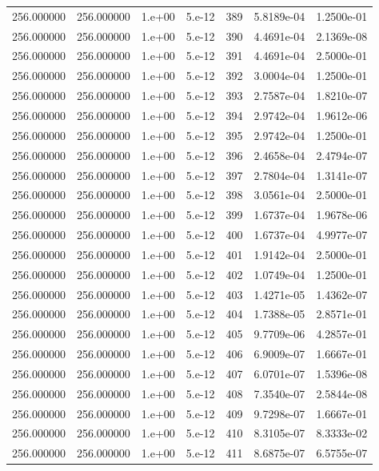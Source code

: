 \begin{table}[htbp]
\begin{tabular}{rrrrrrr}
256.000000 & 256.000000 & 1.e+00 & 5.e-12 & 389 & 5.8189e-04 & 1.2500e-01 \\
256.000000 & 256.000000 & 1.e+00 & 5.e-12 & 390 & 4.4691e-04 & 2.1369e-08 \\
256.000000 & 256.000000 & 1.e+00 & 5.e-12 & 391 & 4.4691e-04 & 2.5000e-01 \\
256.000000 & 256.000000 & 1.e+00 & 5.e-12 & 392 & 3.0004e-04 & 1.2500e-01 \\
256.000000 & 256.000000 & 1.e+00 & 5.e-12 & 393 & 2.7587e-04 & 1.8210e-07 \\
256.000000 & 256.000000 & 1.e+00 & 5.e-12 & 394 & 2.9742e-04 & 1.9612e-06 \\
256.000000 & 256.000000 & 1.e+00 & 5.e-12 & 395 & 2.9742e-04 & 1.2500e-01 \\
256.000000 & 256.000000 & 1.e+00 & 5.e-12 & 396 & 2.4658e-04 & 2.4794e-07 \\
256.000000 & 256.000000 & 1.e+00 & 5.e-12 & 397 & 2.7804e-04 & 1.3141e-07 \\
256.000000 & 256.000000 & 1.e+00 & 5.e-12 & 398 & 3.0561e-04 & 2.5000e-01 \\
256.000000 & 256.000000 & 1.e+00 & 5.e-12 & 399 & 1.6737e-04 & 1.9678e-06 \\
256.000000 & 256.000000 & 1.e+00 & 5.e-12 & 400 & 1.6737e-04 & 4.9977e-07 \\
256.000000 & 256.000000 & 1.e+00 & 5.e-12 & 401 & 1.9142e-04 & 2.5000e-01 \\
256.000000 & 256.000000 & 1.e+00 & 5.e-12 & 402 & 1.0749e-04 & 1.2500e-01 \\
256.000000 & 256.000000 & 1.e+00 & 5.e-12 & 403 & 1.4271e-05 & 1.4362e-07 \\
256.000000 & 256.000000 & 1.e+00 & 5.e-12 & 404 & 1.7388e-05 & 2.8571e-01 \\
256.000000 & 256.000000 & 1.e+00 & 5.e-12 & 405 & 9.7709e-06 & 4.2857e-01 \\
256.000000 & 256.000000 & 1.e+00 & 5.e-12 & 406 & 6.9009e-07 & 1.6667e-01 \\
256.000000 & 256.000000 & 1.e+00 & 5.e-12 & 407 & 6.0701e-07 & 1.5396e-08 \\
256.000000 & 256.000000 & 1.e+00 & 5.e-12 & 408 & 7.3540e-07 & 2.5844e-08 \\
256.000000 & 256.000000 & 1.e+00 & 5.e-12 & 409 & 9.7298e-07 & 1.6667e-01 \\
256.000000 & 256.000000 & 1.e+00 & 5.e-12 & 410 & 8.3105e-07 & 8.3333e-02 \\
256.000000 & 256.000000 & 1.e+00 & 5.e-12 & 411 & 8.6875e-07 & 6.5755e-07 \\

\end{tabular}
\end{table}
